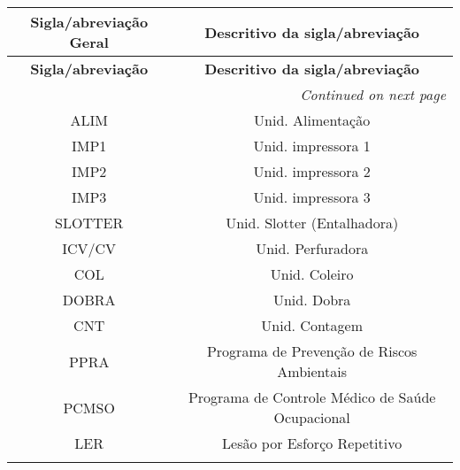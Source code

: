 \begin{longtable}{@{}c c@{}}
\textbf{Sigla/abreviação Geral} & \textbf{Descritivo da sigla/abreviação} \\
\midrule
\endfirsthead
\textbf{Sigla/abreviação} & \textbf{Descritivo da sigla/abreviação} \\
\midrule
\endhead
\midrule
\multicolumn{2}{r}{\textit{Continued on next page}}
\endfoot
\midrule
\endlastfoot

\gls{alm} & Alarme \\
\addlinespace[0.2cm]

\gls{ALIM} & Unid. Alimentação  \\
\addlinespace[0.2cm]

\gls{IMP1} & Unid. impressora 1 \\
\addlinespace[0.2cm]

\gls{IMP2} & Unid. impressora 2 \\
\addlinespace[0.2cm]

\gls{IMP3} & Unid. impressora 3 \\
\addlinespace[0.2cm]

\gls{SLOTTER} & Unid. Slotter (Entalhadora) \\
\addlinespace[0.2cm]

\gls{ICV/CV} & Unid. Perfuradora \\
\addlinespace[0.2cm]

\gls{COL} & Unid. Coleiro \\
\addlinespace[0.2cm]

\gls{DOBRA} & Unid. Dobra \\
\addlinespace[0.2cm]

\gls{CNT} & Unid. Contagem \\
\addlinespace[0.2cm]

\gls{PPRA} & Programa de Prevenção de Riscos Ambientais \\
\addlinespace[0.2cm]

\gls{PCMSO} & Programa de Controle Médico de Saúde Ocupacional \\
\addlinespace[0.2cm]

\gls{LER} & Lesão por Esforço Repetitivo \\
\addlinespace[0.2cm]

\end{longtable}
